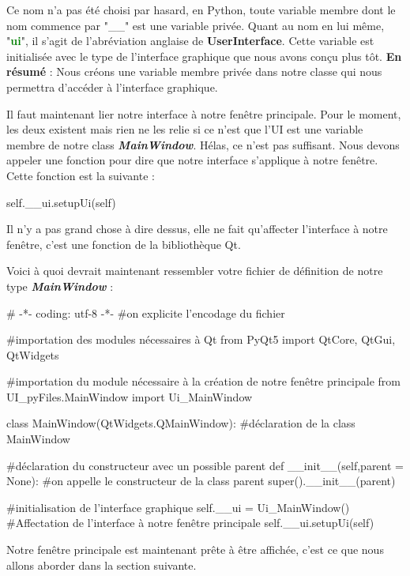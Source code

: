 \documentclass[12pt]{report}    %
\newcommand{\bold}[1]{{\bfseries #1}}
\newcommand{\ib}[1]{{\bfseries\itshape #1}}
\newcommand{\smallSkip}{\vskip 0.5cm}
\begin{document}
Ce nom n'a pas été choisi par hasard, en Python, toute variable membre dont le nom commence par "\_\_" est une variable privée. Quant au nom en lui même,  "\textcolor{green}{\bold{ui}}", il s'agit de l'abréviation anglaise de \bold{UserInterface}.\newline
Cette variable est initialisée avec le type de l'interface graphique que nous avons conçu plus tôt.\newline
\bold{En résumé} : Nous créons une variable membre privée dans notre classe qui nous permettra d'accéder à l'interface graphique.\smallSkip

Il faut maintenant lier notre interface à notre fenêtre principale. Pour le moment, les deux existent mais rien ne les relie si ce n'est que l'UI est une variable membre de notre class \ib{MainWindow}. Hélas, ce n'est pas suffisant. Nous devons appeler une fonction pour dire que notre interface s'applique à notre fenêtre. Cette fonction est la suivante :
\begin{pyCode}
self.__ui.setupUi(self)
\end{pyCode}
Il n'y a pas grand chose à dire dessus, elle ne fait qu'affecter l'interface à notre fenêtre, c'est une fonction de la bibliothèque Qt.\smallSkip

Voici à quoi devrait maintenant ressembler votre fichier de définition de notre type \ib{MainWindow} :
\begin{pyCode}
# -*- coding: utf-8 -*-
#on explicite l’encodage du fichier

#importation des modules nécessaires à Qt
from PyQt5 import QtCore, QtGui, QtWidgets

#importation du module nécessaire à la création de notre fenêtre principale
from UI_pyFiles.MainWindow import Ui_MainWindow

class MainWindow(QtWidgets.QMainWindow): #déclaration de la class MainWindow

	#déclaration du constructeur avec un possible parent
	def __init__(self,parent = None):
		#on appelle le constructeur de la class parent
		super().__init__(parent)

		#initialisation de l'interface graphique
		self.__ui = Ui_MainWindow()
		#Affectation de l'interface à notre fenêtre principale
		self.__ui.setupUi(self)
\end{pyCode}


Notre fenêtre principale est maintenant prête à être affichée, c'est ce que nous allons aborder dans la section suivante.
\end{document}
